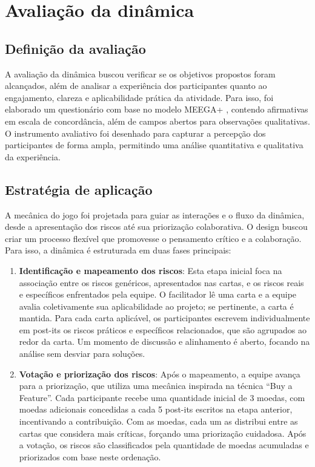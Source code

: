 \documentclass[12pt]{article}
\begin{document}
\section{Avaliação da dinâmica}
\subsection{Definição da avaliação}

A avaliação da dinâmica buscou verificar se os objetivos propostos foram alcançados, além de analisar a experiência dos participantes quanto ao engajamento, clareza e aplicabilidade prática da atividade. Para isso, foi elaborado um questionário com base no modelo MEEGA+ \cite{MEEGA}, contendo afirmativas em escala de concordância, além de campos abertos para observações qualitativas. O instrumento avaliativo foi desenhado para capturar a percepção dos participantes de forma ampla, permitindo uma análise quantitativa e qualitativa da experiência.

\subsection{Estratégia de aplicação}

A mecânica do jogo foi projetada para guiar as interações e o fluxo da dinâmica, desde a apresentação dos riscos até sua priorização colaborativa. O design buscou criar um processo flexível que promovesse o pensamento crítico e a colaboração. Para isso, a dinâmica é estruturada em duas fases principais:

\begin{enumerate}
\item \textbf{Identificação e mapeamento dos riscos}: Esta etapa inicial foca na associação entre os riscos genéricos, apresentados nas cartas, e os riscos reais e específicos enfrentados pela equipe. O facilitador lê uma carta e a equipe avalia coletivamente sua aplicabilidade ao projeto; se pertinente, a carta é mantida. Para cada carta aplicável, os participantes escrevem individualmente em post-its os riscos práticos e específicos relacionados, que são agrupados ao redor da carta. Um momento de discussão e alinhamento é aberto, focando na análise sem desviar para soluções.
\item \textbf{Votação e priorização dos riscos}: Após o mapeamento, a equipe avança para a priorização, que utiliza uma mecânica inspirada na técnica “Buy a Feature”. Cada participante recebe uma quantidade inicial de 3 moedas, com moedas adicionais concedidas a cada 5 post-its escritos na etapa anterior, incentivando a contribuição. Com as moedas, cada um as distribui entre as cartas que considera mais críticas, forçando uma priorização cuidadosa. Após a votação, os riscos são classificados pela quantidade de moedas acumuladas e priorizados com base neste ordenação.
\end{enumerate}
\end{document}
